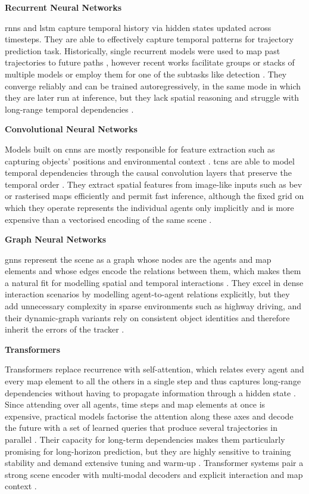 \textbf{Recurrent Neural Networks}

\Acp{rnn} and \ac{lstm} capture temporal history via hidden states updated across timesteps. They are able
to effectively capture temporal patterns for trajectory prediction task. Historically, single recurrent
models were used to map past trajectories to future paths \cite{Hoy2018Pedestrian}, however recent works
facilitate groups or stacks of multiple models \cite{Xin2018DualLSTM} or employ them for one of the subtasks
like detection \cite{Shao2023ReasonNet}. They converge reliably and can be trained autoregressively, in the
same mode in which they are later run at inference, but they lack spatial reasoning and struggle with
long-range temporal dependencies \cite{Liu2021DLSurvey}.

\textbf{Convolutional Neural Networks}

Models built on \acp{cnn} are mostly responsible for feature extraction such as capturing objects' positions
and environmental context \cite{CoverNet2020}. \Acp{tcn} are able to model temporal dependencies through the
causal convolution layers that preserve the temporal order \cite{Nikhil2019CNN}. They extract spatial
features from image-like inputs such as \ac{bev} or rasterised maps efficiently and permit fast inference, 
although the fixed grid on which they operate represents the individual agents only implicitly and is more
expensive than a vectorised encoding of the same scene \cite{Liu2021DLSurvey}.

\textbf{Graph Neural Networks}

\Acp{gnn} represent the scene as a graph whose nodes are the agents and map elements
and whose edges encode the relations between them, which makes them a natural fit for
modelling spatial and temporal interactions \cite{Wang2021GraphTCN}. They excel in dense interaction
scenarios by modelling agent-to-agent relations explicitly, but they add unnecessary complexity in sparse
environments such as highway driving, and their dynamic-graph variants rely on consistent object identities
and therefore inherit the errors of the tracker \cite{madjid2025survey}.

\textbf{Transformers}

Transformers replace recurrence with self-attention, which relates every agent and every map element to
all the others in a single step and thus captures long-range dependencies without having to propagate
information through a hidden state \cite{Liu2021mmTransformer}. Since attending over all agents, time steps
and map elements at once is expensive, practical models factorise the attention along these axes and decode
the future with a set of learned queries that produce several trajectories in parallel
\cite{Wayformer2022}. Their capacity for long-term dependencies makes them particularly promising for
long-horizon prediction, but they are highly sensitive to training stability
and demand extensive tuning and warm-up \cite{madjid2025survey}.
Transformer systems pair a strong scene encoder with multi-modal decoders and explicit
interaction and map context \cite{Liu2021mmTransformer,Ngiam2021SceneTransformer}.

